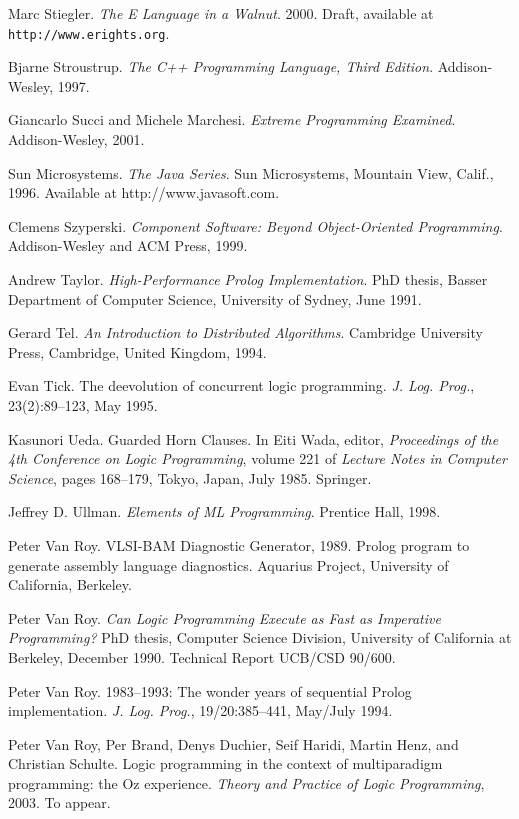 \begin{thebibliography}{213}
Marc Stiegler. \emph{The E Language in a Walnut}. 2000. Draft, available at \verb"http://www.erights.org".

Bjarne Stroustrup. \emph{The C++ Programming Language, Third Edition}. Addison-Wesley, 1997.

Giancarlo Succi and Michele Marchesi. \emph{Extreme Programming Examined}. Addison-Wesley, 2001.

Sun Microsystems. \emph{The Java Series}. Sun Microsystems, Mountain View, Calif., 1996. Available at http://www.javasoft.com.

Clemens Szyperski. \emph{Component Software: Beyond Object-Oriented Programming}. Addison-Wesley and ACM Press, 1999.

Andrew Taylor. \emph{High-Performance Prolog Implementation}. PhD thesis, Basser Department of Computer Science, University of Sydney, June 1991.

Gerard Tel. \emph{An Introduction to Distributed Algorithms}. Cambridge University Press, Cambridge, United Kingdom, 1994.

Evan Tick. The deevolution of concurrent logic programming. \emph{J. Log. Prog.}, 23(2):89–123, May 1995.

Kasunori Ueda. Guarded Horn Clauses. In Eiti Wada, editor, \emph{Proceedings of the 4th Conference on Logic Programming}, volume 221 of \emph{Lecture Notes in Computer Science}, pages 168–179, Tokyo, Japan, July 1985. Springer.

Jeffrey D. Ullman. \emph{Elements of ML Programming}. Prentice Hall, 1998.

Peter Van Roy. VLSI-BAM Diagnostic Generator, 1989. Prolog program to generate assembly language diagnostics. Aquarius Project, University of California, Berkeley.

Peter Van Roy. \emph{Can Logic Programming Execute as Fast as Imperative Programming?} PhD thesis, Computer Science Division, University of California at Berkeley, December 1990. Technical Report UCB/CSD 90/600.

Peter Van Roy. 1983–1993: The wonder years of sequential Prolog implementation. \emph{J. Log. Prog.}, 19/20:385–441, May/July 1994.

Peter Van Roy, Per Brand, Denys Duchier, Seif Haridi, Martin Henz, and Christian Schulte. Logic programming in the context of multiparadigm programming: the Oz experience. \emph{Theory and Practice of Logic Programming}, 2003. To appear.


\end{thebibliography}
